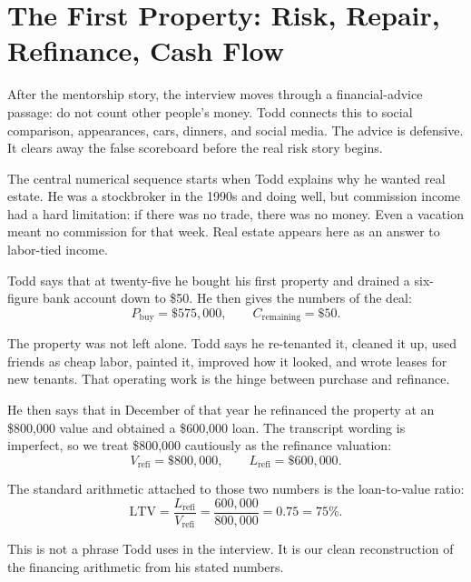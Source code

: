 \section{The First Property: Risk, Repair, Refinance, Cash Flow}

After the mentorship story, the interview moves through a financial-advice passage: do not count other people's money. Todd connects this to social comparison, appearances, cars, dinners, and social media. The advice is defensive. It clears away the false scoreboard before the real risk story begins.

The central numerical sequence starts when Todd explains why he wanted real estate. He was a stockbroker in the 1990s and doing well, but commission income had a hard limitation: if there was no trade, there was no money. Even a vacation meant no commission for that week. Real estate appears here as an answer to labor-tied income.

Todd says that at twenty-five he bought his first property and drained a six-figure bank account down to \$50. He then gives the numbers of the deal:
\begin{equation}
P_{\mathrm{buy}}=\$575{,}000,\qquad C_{\mathrm{remaining}}=\$50.
\end{equation}

The property was not left alone. Todd says he re-tenanted it, cleaned it up, used friends as cheap labor, painted it, improved how it looked, and wrote leases for new tenants. That operating work is the hinge between purchase and refinance.

He then says that in December of that year he refinanced the property at an \$800,000 value and obtained a \$600,000 loan. The transcript wording is imperfect, so we treat \$800,000 cautiously as the refinance valuation:
\begin{equation}
V_{\mathrm{refi}}=\$800{,}000,\qquad L_{\mathrm{refi}}=\$600{,}000.
\end{equation}

The standard arithmetic attached to those two numbers is the loan-to-value ratio:
\begin{equation}
\mathrm{LTV}
=
\frac{L_{\mathrm{refi}}}{V_{\mathrm{refi}}}
=
\frac{600{,}000}{800{,}000}
=
0.75
=
75\%.
\end{equation}

This is not a phrase Todd uses in the interview. It is our clean reconstruction of the financing arithmetic from his stated numbers.

